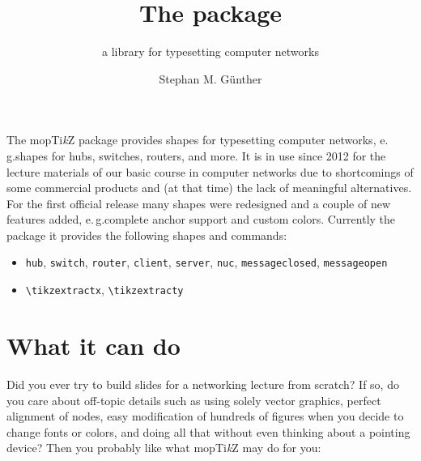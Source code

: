\documentclass{scrartcl}
\title{The \moeptikz{} package}
\subtitle{a library for typesetting computer networks}
\author{Stephan M. G\"unther}
\newcommand*{\TikZ}{Ti\textit{k}Z\xspace}
\newcommand*{\moeptikz}{mo\reflectbox{e}p\TikZ}
\begin{document}
\maketitle

The \moeptikz{} package provides shapes for typesetting computer networks,
e.\,g.\@ shapes for hubs, switches, routers, and more.
It is in use since 2012 for the lecture materials of our basic course in
computer networks due to shortcomings of some commercial products and
(at that time) the lack of meaningful alternatives.
For the first official release many shapes were redesigned and a couple of new
features added, e.\,g.\@ complete anchor support and custom colors.
Currently the package it provides the following shapes and commands:
\begin{itemize}\itemsep0pt
	\item \verb|hub|, \verb|switch|, \verb|router|, \verb|client|,
	\verb|server|, \verb|nuc|, \verb|messageclosed|, \verb|messageopen|
	\item \verb|\tikzextractx|, \verb|\tikzextracty|
\end{itemize}

\section{What it can do}
Did you ever try to build slides for a networking lecture from scratch?
If so, do you care about off-topic details such as using solely vector
graphics, perfect alignment of nodes, easy modification of hundreds of figures
when you decide to change fonts or colors, and doing all that without even
thinking about a pointing device?
Then you probably like what \moeptikz{} may do for you:
\end{document}
